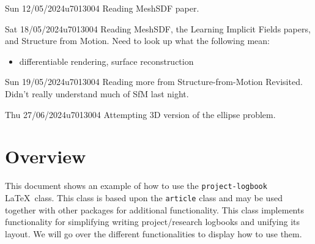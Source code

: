 \documentclass{project-logbook}
\begin{document}

\MakeFrontPage



\newpage

\begin{MeetingMinutes}{Sun 12/05/2024}{u7013004}
	Reading MeshSDF paper.
\end{MeetingMinutes}

\begin{MeetingMinutes}{Sat 18/05/2024}{u7013004}
	Reading MeshSDF, the Learning Implicit Fields papers, and Structure from Motion. Need to look up what the following mean:
	\begin{itemize}
		\item differentiable rendering, surface reconstruction
	\end{itemize}
\end{MeetingMinutes}

\begin{MeetingMinutes}{Sun 19/05/2024}{u7013004}
	Reading more from Structure-from-Motion Revisited. Didn't really understand much of SfM last night.
\end{MeetingMinutes}

\begin{MeetingMinutes}{Thu 27/06/2024}{u7013004}
	Attempting 3D version of the ellipse problem.
\end{MeetingMinutes}


\section{Overview} \label{sec:overview}
	This document shows an example of how to use the \texttt{project-logbook} \LaTeX~class. This class is based upon the \texttt{article} class and may be used together with other packages for additional functionality. This class implements functionality for simplifying writing project/research logbooks and unifying its layout. We will  go over the different functionalities to display how to use them.
\end{document}
